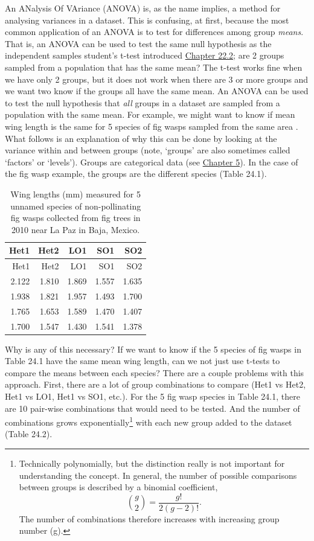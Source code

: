 \documentclass[
  openany]{scrbook}
\begin{document}
An ANalysis Of VAriance (ANOVA) is, as the name implies, a method for analysing variances in a dataset.
This is confusing, at first, because the most common application of an ANOVA is to test for differences among group \emph{means}.
That is, an ANOVA can be used to test the same null hypothesis as the independent samples student's t-test introduced \protect\hyperlink{independent-samples-t-test}{Chapter 22.2}; are 2 groups sampled from a population that has the same mean?
The t-test works fine when we have only 2 groups, but it does not work when there are 3 or more groups and we want two know if the groups all have the same mean.
An ANOVA can be used to test the null hypothesis that \emph{all} groups in a dataset are sampled from a population with the same mean.
For example, we might want to know if mean wing length is the same for 5 species of fig wasps sampled from the same area \citep{Duthie2015b}.
What follows is an explanation of why this can be done by looking at the variance within and between groups (note, `groups' are also sometimes called `factors' or `levels').
Groups are categorical data (see \protect\hyperlink{Chapter_5}{Chapter 5}).
In the case of the fig wasp example, the groups are the different species (Table 24.1).

\begin{longtable}[]{@{}rrrrr@{}}
\caption{\label{tab:unnamed-chunk-93}Wing lengths (mm) measured for 5 unnamed species of non-pollinating fig wasps collected from fig trees in 2010 near La Paz in Baja, Mexico.}\tabularnewline
\toprule
Het1 & Het2 & LO1 & SO1 & SO2 \\
\midrule
\endfirsthead
\toprule
Het1 & Het2 & LO1 & SO1 & SO2 \\
\midrule
\endhead
2.122 & 1.810 & 1.869 & 1.557 & 1.635 \\
1.938 & 1.821 & 1.957 & 1.493 & 1.700 \\
1.765 & 1.653 & 1.589 & 1.470 & 1.407 \\
1.700 & 1.547 & 1.430 & 1.541 & 1.378 \\
\bottomrule
\end{longtable}

Why is any of this necessary?
If we want to know if the 5 species of fig wasps in Table 24.1 have the same mean wing length, can we not just use t-tests to compare the means between each species?
There are a couple problems with this approach.
First, there are a lot of group combinations to compare (Het1 vs Het2, Het1 vs LO1, Het1 vs SO1, etc.).
For the 5 fig wasp species in Table 24.1, there are 10 pair-wise combinations that would need to be tested.
And the number of combinations grows exponentially\footnote{Technically polynomially, but the distinction really is not important for understanding the concept. In general, the number of possible comparisons between groups is described by a binomial coefficient, \[\binom{g}{2} = \frac{g!}{2\left(g - 2 \right)!}.\] The number of combinations therefore increases with increasing group number (g).} with each new group added to the dataset (Table 24.2).
\end{document}
